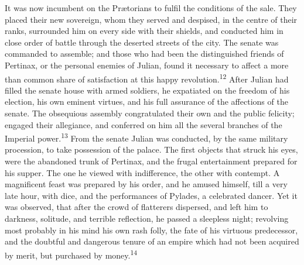 It was now incumbent on the Prætorians to fulfil the conditions
of the sale. They placed their new sovereign, whom they served
and despised, in the centre of their ranks, surrounded him on
every side with their shields, and conducted him in close order
of battle through the deserted streets of the city. The senate
was commanded to assemble; and those who had been the
distinguished friends of Pertinax, or the personal enemies of
Julian, found it necessary to affect a more than common share of
satisfaction at this happy revolution.\textsuperscript{12} After Julian had filled
the senate house with armed soldiers, he expatiated on the
freedom of his election, his own eminent virtues, and his full
assurance of the affections of the senate. The obsequious
assembly congratulated their own and the public felicity; engaged
their allegiance, and conferred on him all the several branches
of the Imperial power.\textsuperscript{13} From the senate Julian was conducted,
by the same military procession, to take possession of the
palace. The first objects that struck his eyes, were the
abandoned trunk of Pertinax, and the frugal entertainment
prepared for his supper. The one he viewed with indifference, the
other with contempt. A magnificent feast was prepared by his
order, and he amused himself, till a very late hour, with dice,
and the performances of Pylades, a celebrated dancer. Yet it was
observed, that after the crowd of flatterers dispersed, and left
him to darkness, solitude, and terrible reflection, he passed a
sleepless night; revolving most probably in his mind his own rash
folly, the fate of his virtuous predecessor, and the doubtful and
dangerous tenure of an empire which had not been acquired by
merit, but purchased by money.\textsuperscript{14}



